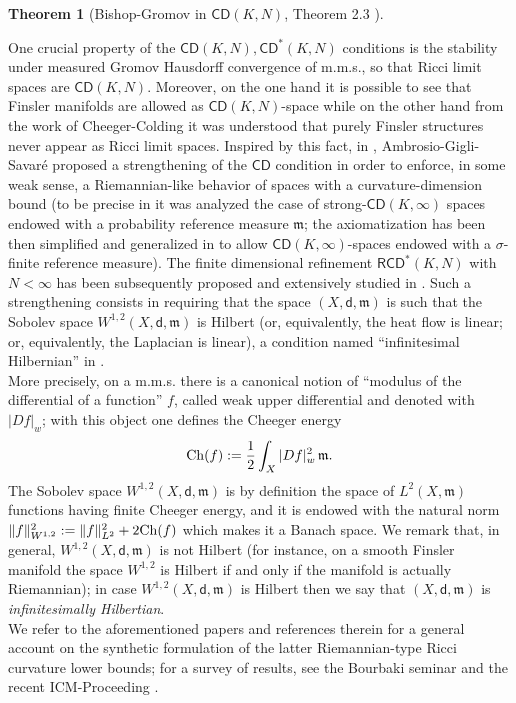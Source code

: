 \documentclass[a4paper]{amsart}
\theoremstyle{plain}
\newtheorem{theorem}[lemma]{Theorem}
\theoremstyle{definition}
\numberwithin{equation}{section}
\newcommand{\RCD}{\mathsf{RCD}}
\newcommand{\CD}{\mathsf{CD}}
\newcommand{\mm}{\mathfrak m}
\newcommand{\sfd}{\mathsf d}
\begin{document}
{{\begin{theorem}[Bishop-Gromov in $\CD(K,N)$, Theorem 2.3 \cite{sturm:II}]
\end{theorem}



One crucial property of the $\CD(K,N), \CD^*(K,N)$ conditions is the stability under measured Gromov Hausdorff convergence of m.m.s., so that Ricci limit spaces are $\CD(K,N)$. Moreover, on the one hand it is possible to see that Finsler manifolds are allowed as $\CD(K,N)$-space while on the other hand from the work of Cheeger-Colding \cite{CC97,CC00a,CC00b}  it was understood that purely Finsler structures never appear as Ricci limit spaces.   Inspired by this fact, in \cite{AGS}, Ambrosio-Gigli-Savar\'e proposed a  strengthening of the $\CD$ condition in order to enforce, in some weak sense, a Riemannian-like behavior of spaces with a curvature-dimension bound (to be precise in  \cite{AGS} it was analyzed the case of strong-$\CD(K,\infty)$ spaces endowed with a probability reference measure $\mm$; the axiomatization has been then simplified and generalized in  \cite{AGMR12} to allow $\CD(K,\infty)$-spaces endowed with a $\sigma$-finite reference measure).
The finite dimensional refinement $\RCD^{*}(K,N)$ with $N<\infty$  has been subsequently proposed and extensively studied
in \cite{gigli:laplacian, EKS,AMS}.  Such a strengthening consists in requiring that the space $(X,\sfd,\mm)$ is such that the Sobolev space $W^{1,2}(X,\sfd,\mm)$ is Hilbert (or, equivalently, the heat flow is linear; or, equivalently, the Laplacian is linear), a condition named ``infinitesimal Hilbernian'' in \cite{gigli:laplacian}. 
\\More precisely,  on a m.m.s. there is a canonical notion of ``modulus of  the differential of a function'' $f$, called weak upper differential and denoted with $|Df|_w$; with this object one defines the Cheeger energy
$${\rm Ch}(f):=\frac 1 2 \int_X |Df|_w^2 \,  \mm.$$
The  Sobolev space $W^{1,2}(X,\sfd,\mm)$ is by definition  the space of $L^2(X,\mm)$ functions having finite Cheeger energy, and it is endowed with the natural norm  $\|f\|^2_{W^{1,2}}:=\|f\|^2_{L^2}+2 {\rm Ch}(f)$ which makes it a Banach space. We remark that, in general, $W^{1,2}(X,\sfd,\mm)$ is not Hilbert (for instance, on a smooth Finsler manifold the space $W^{1,2}$ is Hilbert if and only if the manifold is actually Riemannian); in case  $W^{1,2}(X,\sfd,\mm)$ is  Hilbert then we say that $(X,\sfd,\mm)$ is \emph{infinitesimally Hilbertian}. 
\\ We refer to the aforementioned papers and references therein for a general account
on the synthetic formulation of the latter Riemannian-type Ricci curvature lower bounds; for a survey of results, see the Bourbaki seminar \cite{VilB} and the recent ICM-Proceeding \cite{AmbrosioICM}.

}}
\end{document}
